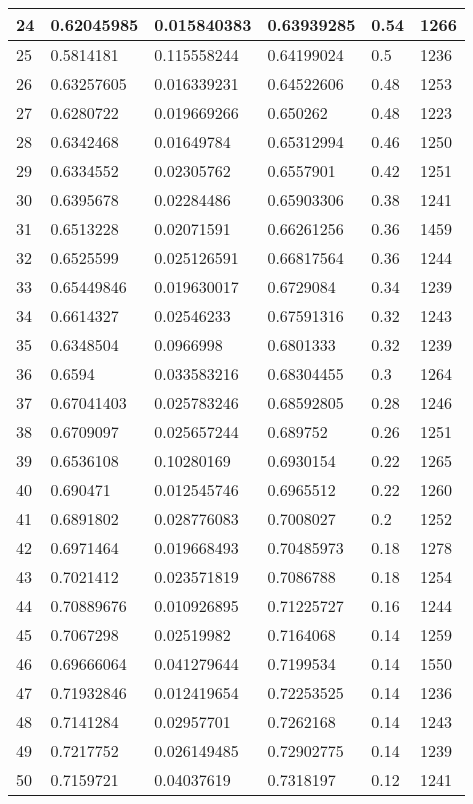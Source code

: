 \begin{longtable}{|l|l|l|l|l|l|}
24 & 0.62045985 & 0.015840383 & 0.63939285 & 0.54 & 1266 \\ \hline 
25 & 0.5814181 & 0.115558244 & 0.64199024 & 0.5 & 1236 \\ \hline 
26 & 0.63257605 & 0.016339231 & 0.64522606 & 0.48 & 1253 \\ \hline 
27 & 0.6280722 & 0.019669266 & 0.650262 & 0.48 & 1223 \\ \hline 
28 & 0.6342468 & 0.01649784 & 0.65312994 & 0.46 & 1250 \\ \hline 
29 & 0.6334552 & 0.02305762 & 0.6557901 & 0.42 & 1251 \\ \hline 
30 & 0.6395678 & 0.02284486 & 0.65903306 & 0.38 & 1241 \\ \hline 
31 & 0.6513228 & 0.02071591 & 0.66261256 & 0.36 & 1459 \\ \hline 
32 & 0.6525599 & 0.025126591 & 0.66817564 & 0.36 & 1244 \\ \hline 
33 & 0.65449846 & 0.019630017 & 0.6729084 & 0.34 & 1239 \\ \hline 
34 & 0.6614327 & 0.02546233 & 0.67591316 & 0.32 & 1243 \\ \hline 
35 & 0.6348504 & 0.0966998 & 0.6801333 & 0.32 & 1239 \\ \hline 
36 & 0.6594 & 0.033583216 & 0.68304455 & 0.3 & 1264 \\ \hline 
37 & 0.67041403 & 0.025783246 & 0.68592805 & 0.28 & 1246 \\ \hline 
38 & 0.6709097 & 0.025657244 & 0.689752 & 0.26 & 1251 \\ \hline 
39 & 0.6536108 & 0.10280169 & 0.6930154 & 0.22 & 1265 \\ \hline 
40 & 0.690471 & 0.012545746 & 0.6965512 & 0.22 & 1260 \\ \hline 
41 & 0.6891802 & 0.028776083 & 0.7008027 & 0.2 & 1252 \\ \hline 
42 & 0.6971464 & 0.019668493 & 0.70485973 & 0.18 & 1278 \\ \hline 
43 & 0.7021412 & 0.023571819 & 0.7086788 & 0.18 & 1254 \\ \hline 
44 & 0.70889676 & 0.010926895 & 0.71225727 & 0.16 & 1244 \\ \hline 
45 & 0.7067298 & 0.02519982 & 0.7164068 & 0.14 & 1259 \\ \hline 
46 & 0.69666064 & 0.041279644 & 0.7199534 & 0.14 & 1550 \\ \hline 
47 & 0.71932846 & 0.012419654 & 0.72253525 & 0.14 & 1236 \\ \hline 
48 & 0.7141284 & 0.02957701 & 0.7262168 & 0.14 & 1243 \\ \hline 
49 & 0.7217752 & 0.026149485 & 0.72902775 & 0.14 & 1239 \\ \hline 
50 & 0.7159721 & 0.04037619 & 0.7318197 & 0.12 & 1241 \\ \hline 
\end{longtable}